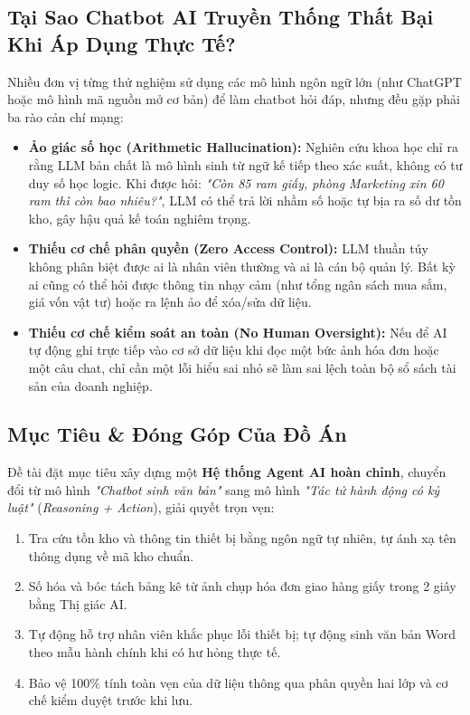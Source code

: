 \documentclass[11pt,a4paper]{article}
\begin{document}
\subsection{Tại Sao Chatbot AI Truyền Thống Thất Bại Khi Áp Dụng Thực Tế?}
Nhiều đơn vị từng thử nghiệm sử dụng các mô hình ngôn ngữ lớn (như ChatGPT hoặc mô hình mã nguồn mở cơ bản) để làm chatbot hỏi đáp, nhưng đều gặp phải ba rào cản chí mạng:
\begin{itemize}[leftmargin=1.5em]
    \item \textbf{Ảo giác số học (Arithmetic Hallucination):} Nghiên cứu khoa học \cite{hallucinationtax2026} chỉ ra rằng LLM bản chất là mô hình sinh từ ngữ kế tiếp theo xác suất, không có tư duy số học logic. Khi được hỏi: \textit{"Còn 85 ram giấy, phòng Marketing xin 60 ram thì còn bao nhiêu?"}, LLM có thể trả lời nhầm số hoặc tự bịa ra số dư tồn kho, gây hậu quả kế toán nghiêm trọng.
    \item \textbf{Thiếu cơ chế phân quyền (Zero Access Control):} LLM thuần túy không phân biệt được ai là nhân viên thường và ai là cán bộ quản lý. Bất kỳ ai cũng có thể hỏi được thông tin nhạy cảm (như tổng ngân sách mua sắm, giá vốn vật tư) hoặc ra lệnh ảo để xóa/sửa dữ liệu.
    \item \textbf{Thiếu cơ chế kiểm soát an toàn (No Human Oversight):} Nếu để AI tự động ghi trực tiếp vào cơ sở dữ liệu khi đọc một bức ảnh hóa đơn hoặc một câu chat, chỉ cần một lỗi hiểu sai nhỏ sẽ làm sai lệch toàn bộ sổ sách tài sản của doanh nghiệp.
\end{itemize}

\subsection{Mục Tiêu \& Đóng Góp Của Đồ Án}
Đề tài đặt mục tiêu xây dựng một \textbf{Hệ thống Agent AI hoàn chỉnh}, chuyển đổi từ mô hình \textit{"Chatbot sinh văn bản"} sang mô hình \textit{"Tác tử hành động có kỷ luật"} (\textit{Reasoning + Action}), giải quyết trọn vẹn:
\begin{enumerate}[leftmargin=1.5em]
    \item Tra cứu tồn kho và thông tin thiết bị bằng ngôn ngữ tự nhiên, tự ánh xạ tên thông dụng về mã kho chuẩn.
    \item Số hóa và bóc tách bảng kê từ ảnh chụp hóa đơn giao hàng giấy trong 2 giây bằng Thị giác AI.
    \item Tự động hỗ trợ nhân viên khắc phục lỗi thiết bị; tự động sinh văn bản Word theo mẫu hành chính khi có hư hỏng thực tế.
    \item Bảo vệ 100\% tính toàn vẹn của dữ liệu thông qua phân quyền hai lớp và cơ chế kiểm duyệt trước khi lưu.
\end{enumerate}
\end{document}
